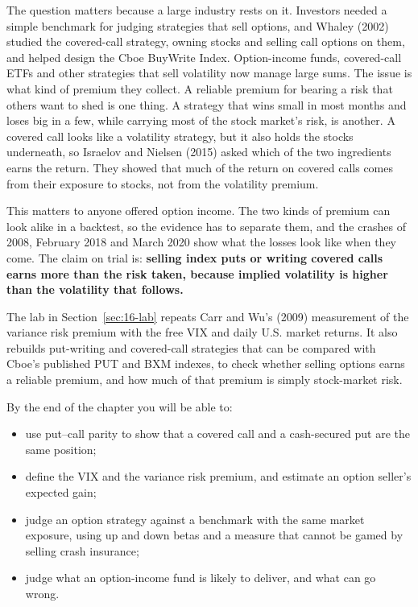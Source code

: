 The question matters because a large industry rests on it. Investors needed a simple benchmark for judging strategies that sell options, and Whaley (2002) studied the covered-call strategy, owning stocks and selling call options on them, and helped design the Cboe BuyWrite Index. Option-income funds, covered-call ETFs and other strategies that sell volatility now manage large sums. The issue is what kind of premium they collect. A reliable premium for bearing a risk that others want to shed is one thing. A strategy that wins small in most months and loses big in a few, while carrying most of the stock market's risk, is another. A covered call looks like a volatility strategy, but it also holds the stocks underneath, so Israelov and Nielsen (2015) asked which of the two ingredients earns the return. They showed that much of the return on covered calls comes from their exposure to stocks, not from the volatility premium.

This matters to anyone offered option income. The two kinds of premium can look alike in a backtest, so the evidence has to separate them, and the crashes of 2008, February 2018 and March 2020 show what the losses look like when they come. The claim on trial is: \textbf{selling index puts or writing covered calls earns more than the risk taken, because implied volatility is higher than the volatility that follows.}

The lab in Section~\ref{sec:16-lab} repeats Carr and Wu's (2009) measurement of the variance risk premium with the free VIX and daily U.S. market returns. It also rebuilds put-writing and covered-call strategies that can be compared with Cboe's published PUT and BXM indexes, to check whether selling options earns a reliable premium, and how much of that premium is simply stock-market risk.

By the end of the chapter you will be able to:

\begin{itemize}
  \item use put--call parity to show that a covered call and a cash-secured put are the same position;
  \item define the VIX and the variance risk premium, and estimate an option seller's expected gain;
  \item judge an option strategy against a benchmark with the same market exposure, using up and down betas and a measure that cannot be gamed by selling crash insurance;
  \item judge what an option-income fund is likely to deliver, and what can go wrong.
\end{itemize}

